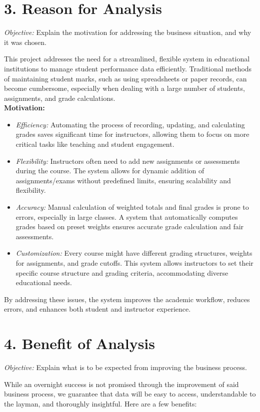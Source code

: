 \documentclass[12pt]{article}
\begin{document}
\section*{3. Reason for Analysis}
\textit{Objective:} Explain the motivation for addressing the business situation, and why it was chosen.

\noindent
This project addresses the need for a streamlined, flexible system in educational institutions to manage student performance data efficiently. Traditional methods of maintaining student marks, such as using spreadsheets or paper records, can become cumbersome, especially when dealing with a large number of students, assignments, and grade calculations.\\
\textbf{Motivation: }
\begin{itemize}
\item \textit{Efficiency:} Automating the process of recording, updating, and calculating grades saves significant time for instructors, allowing them to focus on more critical tasks like teaching and student engagement.
\item \textit{Flexibility:} Instructors often need to add new assignments or assessments during the course. The system allows for dynamic addition of assignments/exams without predefined limits, ensuring scalability and flexibility.
\item \textit{Accuracy:} Manual calculation of weighted totals and final grades is prone to errors, especially in large classes. A system that automatically computes grades based on preset weights ensures accurate grade calculation and fair assessments.
\item \textit{Customization:} Every course might have different grading structures, weights for assignments, and grade cutoffs. This system allows instructors to set their specific course structure and grading criteria, accommodating diverse educational needs.
\end{itemize}
By addressing these issues, the system improves the academic workflow, reduces errors, and enhances both student and instructor experience. 

\section*{4. Benefit of Analysis}
\textit{Objective:} Explain what is to be expected from improving the business process. 

\noindent
While an overnight success is not promised through the improvement of said business process, we guarantee that data will be easy to access, understandable to the layman, and thoroughly insightful. Here are a few benefits:
\end{document}
